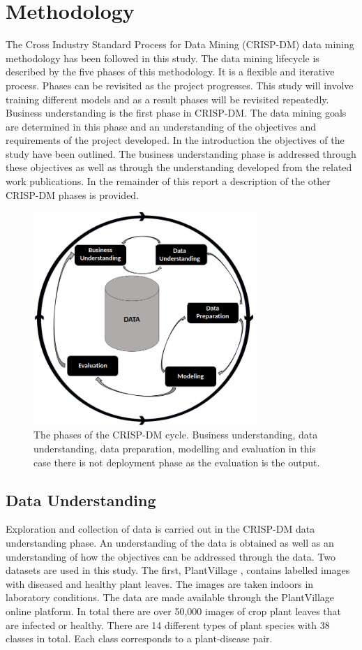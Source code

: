 \documentclass[conference]{IEEEtran}
\begin{document}
\section{Methodology }

The Cross Industry Standard Process for Data Mining (CRISP-DM) data mining methodology has been followed in this study. The data mining lifecycle is described by the five phases of this methodology. It is a flexible and iterative process. Phases can be revisited as the project progresses. This study will involve training different models and as a result phases will be revisited repeatedly. Business understanding is the first phase in CRISP-DM. The data mining goals are determined in this phase and an understanding of the objectives and requirements of the project developed. In the introduction the objectives of the study have been outlined. The business understanding phase is addressed through these objectives as well as through the understanding developed from the related work publications. In the remainder of this report a description of the other CRISP-DM phases is provided.
\begin{figure}[htbp]
\centerline{\includegraphics[width=8.5cm]{CRISP_DM_no deployment.png}}
\caption{    The phases of the CRISP-DM cycle. Business understanding, data understanding, data preparation, modelling and evaluation in this case there is not deployment phase as the evaluation is the output.}
\label{fig}
\end{figure}



\subsection{Data Understanding}\label{AA}
Exploration and collection of data is carried out in the CRISP-DM data understanding phase. An understanding of the data is obtained as well as an understanding of how the objectives can be addressed through the data. Two datasets are used in this study. The first, PlantVillage \cite{kaggledatasetPlantville}, contains labelled images with diseased and healthy plant leaves. The images are taken indoors in laboratory conditions. The data are made available through the PlantVillage online platform. In total there are over 50,000 images of crop plant leaves that are infected or healthy. There are 14 different types of plant species with 38 classes in total. Each class corresponds to a plant-disease pair. 
\end{document}
